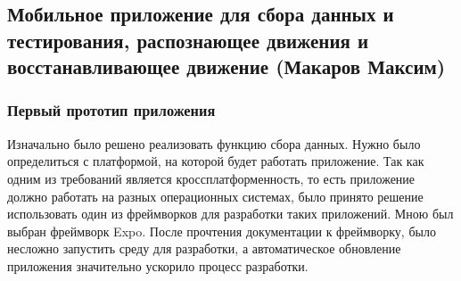 \newpage
\subsection{Мобильное приложение для сбора данных и тестирования, распознающее движения и восстанавливающее движение (Макаров Максим)}

\subsubsection{Первый прототип приложения}


Изначально было решено реализовать функцию сбора данных. 
Нужно было определиться с платформой, на которой будет работать приложение. Так как одним из требований является кроссплатформенность, то есть приложение должно работать на разных операционных системах, было принято решение использовать один из фреймворков для разработки таких приложений.
Мною был выбран фреймворк Expo.
После прочтения документации к фреймворку, было несложно запустить среду для разработки, а автоматическое обновление приложения значительно ускорило процесс разработки.

